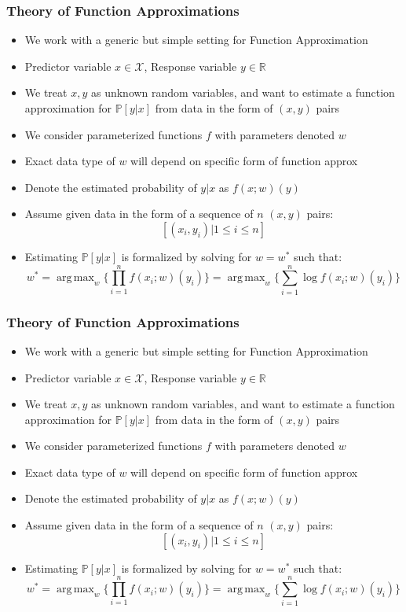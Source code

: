 \documentclass[handout]{beamer}
\DeclareMathOperator*{\argmax}{arg\,max}
\begin{document}
\begin{frame}
\frametitle{Theory of Function Approximations}
\pause
\begin{itemize}[<+->]
\item We work with a generic but simple setting for Function Approximation
\item Predictor variable $x \in \mathcal{X}$, Response variable $y \in \mathbb{R}$
\item We treat $x, y$ as unknown random variables, and want to estimate a function approximation for $\mathbb{P}[y|x]$ from data in the form of $(x,y)$ pairs
\item We consider parameterized functions $f$ with parameters denoted $w$
\item  Exact data type of $w$ will depend on specific form of function approx
\item  Denote the estimated probability of $y|x$ as $f(x; w)(y)$
\item  Assume given data in the form of a sequence of $n$ $(x,y)$ pairs:
$$[(x_i, y_i)|1 \leq i \leq n]$$
\item  Estimating $\mathbb{P}[y|x]$ is formalized by solving for $w=w^*$ such that:
$$w^* = \argmax_w \{ \prod_{i=1}^n f(x_i; w)(y_i)\} = \argmax_w \{ \sum_{i=1}^n \log f(x_i; w)(y_i)\}$$
\end{itemize}
\end{frame}

\begin{frame}
\frametitle{Theory of Function Approximations}
\pause
\begin{itemize}[<+->]
\item We work with a generic but simple setting for Function Approximation
\item Predictor variable $x \in \mathcal{X}$, Response variable $y \in \mathbb{R}$
\item We treat $x, y$ as unknown random variables, and want to estimate a function approximation for $\mathbb{P}[y|x]$ from data in the form of $(x,y)$ pairs
\item We consider parameterized functions $f$ with parameters denoted $w$
\item  Exact data type of $w$ will depend on specific form of function approx
\item  Denote the estimated probability of $y|x$ as $f(x; w)(y)$
\item  Assume given data in the form of a sequence of $n$ $(x,y)$ pairs:
$$[(x_i, y_i)|1 \leq i \leq n]$$
\item  Estimating $\mathbb{P}[y|x]$ is formalized by solving for $w=w^*$ such that:
$$w^* = \argmax_w \{ \prod_{i=1}^n f(x_i; w)(y_i)\} = \argmax_w \{ \sum_{i=1}^n \log f(x_i; w)(y_i)\}$$
\end{itemize}
\end{frame}
\end{document}
